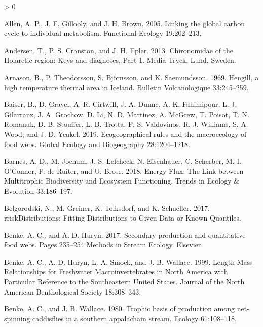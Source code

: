 \documentclass[
]{article}
\newlength{\cslhangindent}
\newenvironment{CSLReferences}[2] %
 {%
  \setlength{\parindent}{0pt}
  \ifodd #1 \everypar{\setlength{\hangindent}{\cslhangindent}}\ignorespaces\fi
  \ifnum #2 > 0
  \setlength{\parskip}{#2\baselineskip}
  \fi
 }%
 {}
\begin{document}
\hypertarget{refs}{}
\begin{CSLReferences}{1}{0}
\leavevmode\hypertarget{ref-allen2005}{}%
Allen, A. P., J. F. Gillooly, and J. H. Brown. 2005. Linking the global
carbon cycle to individual metabolism. Functional Ecology 19:202--213.

\leavevmode\hypertarget{ref-andersen2013}{}%
Andersen, T., P. S. Cranston, and J. H. Epler. 2013. Chironomidae of the
{Holarctic} region: {Keys} and diagnoses, {Part} 1. {Media Tryck},
{Lund, Sweden}.

\leavevmode\hypertarget{ref-arnason1969}{}%
Arnason, B., P. Theodorsson, S. Björnsson, and K. Saemundsson. 1969.
Hengill, a high temperature thermal area in {Iceland}. Bulletin
Volcanologique 33:245--259.

\leavevmode\hypertarget{ref-baiser2019}{}%
Baiser, B., D. Gravel, A. R. Cirtwill, J. A. Dunne, A. K. Fahimipour, L.
J. Gilarranz, J. A. Grochow, D. Li, N. D. Martinez, A. McGrew, T.
Poisot, T. N. Romanuk, D. B. Stouffer, L. B. Trotta, F. S. Valdovinos,
R. J. Williams, S. A. Wood, and J. D. Yeakel. 2019. Ecogeographical
rules and the macroecology of food webs. Global Ecology and Biogeography
28:1204--1218.

\leavevmode\hypertarget{ref-barnes2018}{}%
Barnes, A. D., M. Jochum, J. S. Lefcheck, N. Eisenhauer, C. Scherber, M.
I. O'Connor, P. de Ruiter, and U. Brose. 2018. Energy {Flux}: {The Link}
between {Multitrophic Biodiversity} and {Ecosystem Functioning}. Trends
in Ecology \& Evolution 33:186--197.

\leavevmode\hypertarget{ref-belgorodski2017}{}%
Belgorodski, N., M. Greiner, K. Tolksdorf, and K. Schueller. 2017.
{rriskDistributions}: {Fitting Distributions} to {Given Data} or {Known
Quantiles}.

\leavevmode\hypertarget{ref-benke2017}{}%
Benke, A. C., and A. D. Huryn. 2017. Secondary production and
quantitative food webs. Pages 235--254 Methods in {Stream Ecology}.
{Elsevier}.

\leavevmode\hypertarget{ref-benke1999}{}%
Benke, A. C., A. D. Huryn, L. A. Smock, and J. B. Wallace. 1999.
Length-{Mass Relationships} for {Freshwater Macroinvertebrates} in
{North America} with {Particular Reference} to the {Southeastern United
States}. Journal of the North American Benthological Society
18:308--343.

\leavevmode\hypertarget{ref-benke1980}{}%
Benke, A. C., and J. B. Wallace. 1980. Trophic basis of production among
net-spinning caddisflies in a southern appalachain stream. Ecology
61:108--118.


\end{CSLReferences}
\end{document}
